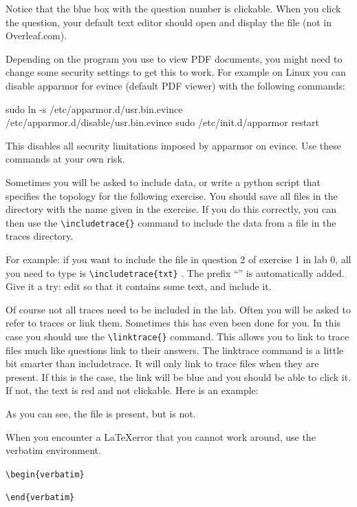 \begin{exercise}{}


Notice that the blue box with the question number is clickable. When you click the question, your default text editor should open and display the file  (not in Overleaf.com).

\remark Depending on the program you use to view PDF documents, you might need to change some security settings to get this to work. For example on Linux you can disable apparmor for evince (default PDF viewer) with the following commands:
\begin{cmdblock}
	sudo ln -s /etc/apparmor.d/usr.bin.evince /etc/apparmor.d/disable/usr.bin.evince
	sudo /etc/init.d/apparmor restart 
\end{cmdblock}

\remark This disables all security limitations imposed by apparmor on evince. Use these commands at your own risk.

Sometimes you will be asked to include data, or write a python script that specifies the topology for the following exercise. You should save all files in the  directory with the name given in the exercise. If you do this correctly, you can then use the \verb|\includetrace{}| command to include the data from a file in the traces directory.

For example: if you want to include the file  in question 2 of exercise 1 in lab 0, all you need to type is \verb|\includetrace{txt}| . The prefix ``'' is automatically added. Give it a try: edit  so that it contains some text, and include it.


Of course not all traces need to be included in the lab. Often you will be asked to refer to traces or link them. Sometimes this has even been done for you. In this case you should use the \verb|\linktrace{}| command. This allows you to link to trace files much like questions link to their answers. The linktrace command is a little bit smarter than includetrace. It will only link to trace files when they are present. If this is the case, the link will be blue and you should be able to click it. If not, the text is red and not clickable. Here is an example:

As you can see, the file  is present, but  is not.

When you encounter a \LaTeX error that you cannot work around, use the verbatim environment.

\verb!\begin{verbatim}!

\verb!\end{verbatim}!

\end{exercise}

